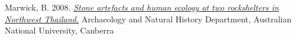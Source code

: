 
\ind Marwick, B. 2008. \emph{\href{http://dx.doi.org/10.6084/m9.figshare.765252}{Stone artefacts and human ecology at two rockshelters in Northwest Thailand.}} Archaeology and Natural History Department, Australian National University, Canberra
